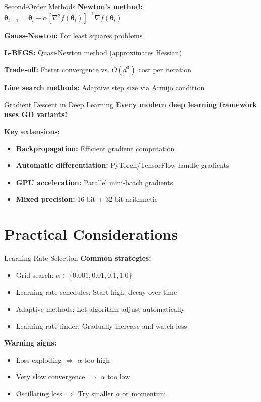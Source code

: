 \documentclass[aspectratio=169,11pt]{beamer}
\newcommand{\grad}{\nabla}
\newcommand{\hess}{\nabla^2}
\newcommand{\vtheta}{\bm{\theta}}
\begin{document}
\begin{frame}{Second-Order Methods}
\textbf{Newton's method:} $\vtheta_{t+1} = \vtheta_t - \alpha [\hess f(\vtheta_t)]^{-1} \grad f(\vtheta_t)$

\textbf{Gauss-Newton:} For least squares problems

\textbf{L-BFGS:} Quasi-Newton method (approximates Hessian)

\pause
\textbf{Trade-off:} Faster convergence vs. $O(d^3)$ cost per iteration

\pause
\textbf{Line search methods:} Adaptive step size via Armijo condition
\end{frame}

\begin{frame}{Gradient Descent in Deep Learning}
\textbf{Every modern deep learning framework uses GD variants!}

\textbf{Key extensions:}
\begin{itemize}
\item \textbf{Backpropagation:} Efficient gradient computation
\item \textbf{Automatic differentiation:} PyTorch/TensorFlow handle gradients
\item \textbf{GPU acceleration:} Parallel mini-batch gradients
\item \textbf{Mixed precision:} 16-bit + 32-bit arithmetic
\end{itemize}
\end{frame}

\section{Practical Considerations}

\begin{frame}{Learning Rate Selection}
\textbf{Common strategies:}
\begin{itemize}
\item Grid search: $\alpha \in \{0.001, 0.01, 0.1, 1.0\}$
\item Learning rate schedules: Start high, decay over time
\item Adaptive methods: Let algorithm adjust automatically
\item Learning rate finder: Gradually increase and watch loss
\end{itemize}

\pause
\textbf{Warning signs:}
\begin{itemize}
\item Loss exploding $\Rightarrow$ $\alpha$ too high
\item Very slow convergence $\Rightarrow$ $\alpha$ too low
\item Oscillating loss $\Rightarrow$ Try smaller $\alpha$ or momentum
\end{itemize}
\end{frame}
\end{document}
